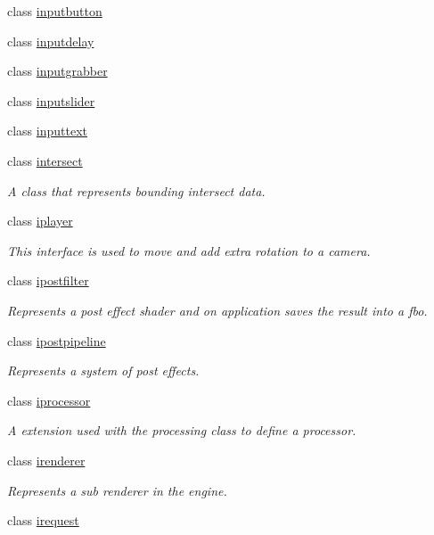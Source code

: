 \begin{DoxyCompactItemize}
class \hyperlink{classflounder_1_1inputbutton}{inputbutton}
\item 
class \hyperlink{classflounder_1_1inputdelay}{inputdelay}
\item 
class \hyperlink{classflounder_1_1inputgrabber}{inputgrabber}
\item 
class \hyperlink{classflounder_1_1inputslider}{inputslider}
\item 
class \hyperlink{classflounder_1_1inputtext}{inputtext}
\item 
class \hyperlink{classflounder_1_1intersect}{intersect}
\begin{DoxyCompactList}\small\item\em A class that represents bounding intersect data. \end{DoxyCompactList}\item 
class \hyperlink{classflounder_1_1iplayer}{iplayer}
\begin{DoxyCompactList}\small\item\em This interface is used to move and add extra rotation to a camera. \end{DoxyCompactList}\item 
class \hyperlink{classflounder_1_1ipostfilter}{ipostfilter}
\begin{DoxyCompactList}\small\item\em Represents a post effect shader and on application saves the result into a fbo. \end{DoxyCompactList}\item 
class \hyperlink{classflounder_1_1ipostpipeline}{ipostpipeline}
\begin{DoxyCompactList}\small\item\em Represents a system of post effects. \end{DoxyCompactList}\item 
class \hyperlink{classflounder_1_1iprocessor}{iprocessor}
\begin{DoxyCompactList}\small\item\em A extension used with the processing class to define a processor. \end{DoxyCompactList}\item 
class \hyperlink{classflounder_1_1irenderer}{irenderer}
\begin{DoxyCompactList}\small\item\em Represents a sub renderer in the engine. \end{DoxyCompactList}\item 
class \hyperlink{classflounder_1_1irequest}{irequest}

\end{DoxyCompactItemize}
